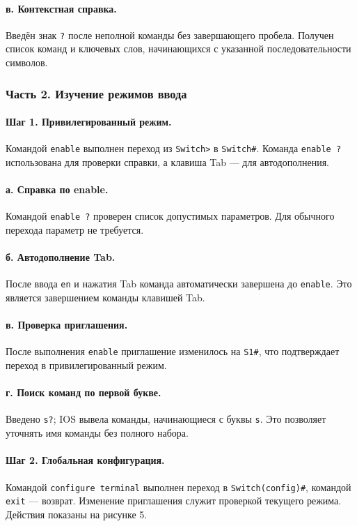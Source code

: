 \documentclass[a4paper,14pt,oneside]{extarticle}
\begin{document}
\paragraph{в. Контекстная справка.}
Введён знак \texttt{?} после неполной команды без завершающего пробела.
Получен список команд и ключевых слов, начинающихся с указанной
последовательности символов.
\subsubsection{Часть 2. Изучение режимов ввода}

\paragraph{Шаг 1. Привилегированный режим.}
Командой \texttt{enable} выполнен переход из \texttt{Switch>} в
\texttt{Switch\#}. Команда \texttt{enable ?} использована для проверки
справки, а клавиша Tab --- для автодополнения.

\paragraph{а. Справка по enable.}
Командой \texttt{enable ?} проверен список допустимых параметров. Для
обычного перехода параметр не требуется.

\paragraph{б. Автодополнение Tab.}
После ввода \texttt{en} и нажатия Tab команда автоматически завершена до
\texttt{enable}. Это является завершением команды клавишей Tab.

\paragraph{в. Проверка приглашения.}
После выполнения \texttt{enable} приглашение изменилось на
\texttt{S1\#}, что подтверждает переход в привилегированный режим.

\paragraph{г. Поиск команд по первой букве.}
Введено \texttt{s?}; IOS вывела команды, начинающиеся с буквы \texttt{s}.
Это позволяет уточнять имя команды без полного набора.

\paragraph{Шаг 2. Глобальная конфигурация.}
Командой \texttt{configure terminal} выполнен переход в
\texttt{Switch(config)\#}, командой \texttt{exit} --- возврат. Изменение
приглашения служит проверкой текущего режима. Действия показаны на рисунке 5.
\end{document}
